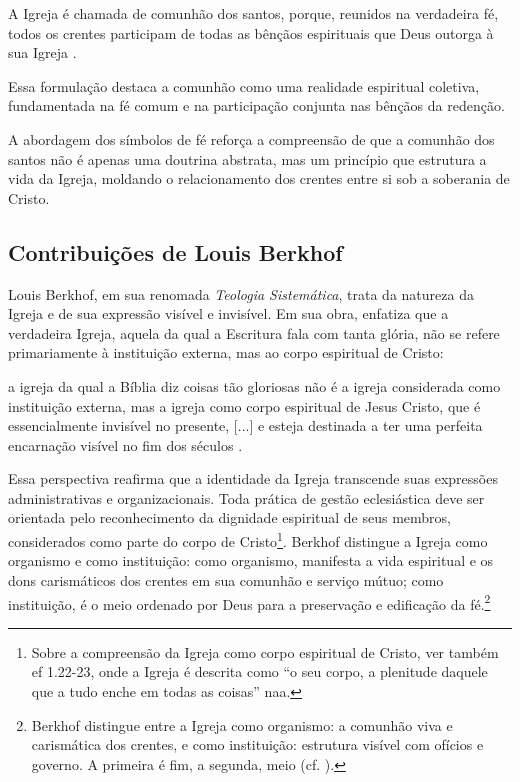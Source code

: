 \begin{citacao}
    A Igreja é chamada de comunhão dos santos, porque, reunidos na verdadeira fé, todos os crentes participam de todas as bênçãos espirituais que Deus outorga à sua Igreja \cite{helvetica}.
\end{citacao}

Essa formulação destaca a comunhão como uma realidade espiritual coletiva, fundamentada na fé comum e na participação conjunta nas bênçãos da redenção.

A abordagem dos símbolos de fé reforça a compreensão de que a comunhão dos santos não é apenas uma doutrina abstrata, mas um princípio que estrutura a vida da Igreja, moldando o relacionamento dos crentes entre si sob a soberania de Cristo.

\subsection{Contribuições de Louis Berkhof}

Louis Berkhof, em sua renomada \textit{Teologia Sistemática}, trata da natureza da Igreja e de sua expressão visível e invisível. Em sua obra, enfatiza que a verdadeira Igreja, aquela da qual a Escritura fala com tanta glória, não se refere primariamente à instituição externa, mas ao corpo espiritual de Cristo:

\begin{citacao}
    a igreja da qual a Bíblia diz coisas tão gloriosas não é a igreja considerada como instituição externa, mas a igreja como corpo espiritual de Jesus Cristo, que é essencialmente invisível no presente, [...] e esteja destinada a ter uma perfeita encarnação visível no fim dos séculos \cite[p.~644]{berkhof2012}.
\end{citacao}

Essa perspectiva reafirma que a identidade da Igreja transcende suas expressões administrativas e organizacionais. Toda prática de gestão eclesiástica deve ser orientada pelo reconhecimento da dignidade espiritual de seus membros, considerados como parte do corpo de Cristo\footnote{Sobre a compreensão da Igreja como corpo espiritual de Cristo, ver também \gls{ef} 1.22-23, onde a Igreja é descrita como ``o seu corpo, a plenitude daquele que a tudo enche em todas as coisas'' \gls{naa}.}. Berkhof distingue a Igreja como organismo e como instituição: como organismo, manifesta a vida espiritual e os dons carismáticos dos crentes em sua comunhão e serviço mútuo; como instituição, é o meio ordenado por Deus para a preservação e edificação da fé.\footnote{Berkhof distingue entre a Igreja como organismo: a comunhão viva e carismática dos crentes, e como instituição: estrutura visível com ofícios e governo. A primeira é fim, a segunda, meio (cf. \cite[p.~638]{berkhof2012}).}

